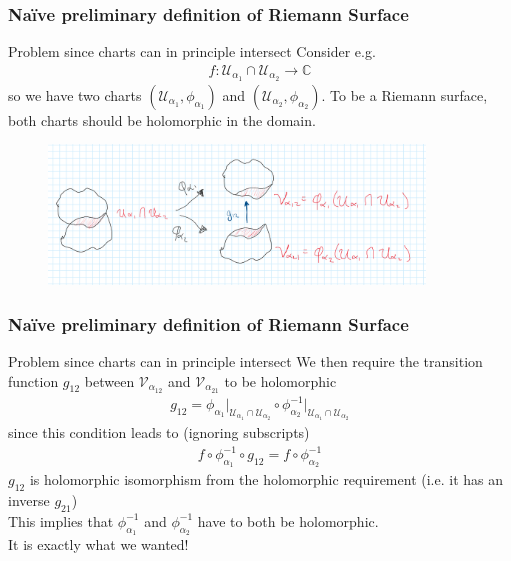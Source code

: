 \documentclass{beamer}[10]
\begin{document}
\begin{frame}
	\frametitle{Naïve preliminary definition of Riemann Surface}
	\begin{block}{Problem since charts can in principle intersect}
		Consider e.g. 
		\begin{equation}
			\begin{aligned}
				f:\mathcal{U}_{\alpha_1}\cap \mathcal{U}_{\alpha_2}\to \mathds{C}
			\end{aligned}
		\end{equation}
	so we have two charts $(\mathcal{U}_{\alpha_1},\phi_{\alpha_1})$ and $(\mathcal{U}_{\alpha_2},\phi_{\alpha_2})$. To be a Riemann surface, both charts should be holomorphic in the domain.
	\end{block}
\begin{figure}
	\includegraphics[width=10cm]{5}
\end{figure}
\end{frame} 


\begin{frame}
	\frametitle{Naïve preliminary definition of Riemann Surface}
	\begin{block}{Problem since charts can in principle intersect}
	We then require the transition function $g_{12}$ between $\mathcal{V}_{\alpha_{12}}$ and $\mathcal{V}_{\alpha_{21}}$ to be holomorphic
	\begin{equation}
		\begin{aligned}
			g_{12}=\phi_{\alpha_1}\big|_{\mathcal{U}_{\alpha_1}\cap \mathcal{U}_{\alpha_2}}\circ \phi_{\alpha_2}^{-1}\big|_{\mathcal{U}_{\alpha_1}\cap \mathcal{U}_{\alpha_2}}
		\end{aligned}
	\end{equation}
	since this condition leads to (ignoring subscripts)
	\begin{equation}
		\begin{aligned}
			f\circ \phi_{\alpha_1}^{-1}\circ g_{12}=f\circ \phi_{\alpha_2}^{-1}
		\end{aligned}
	\end{equation}
$g_{12}$ is holomorphic isomorphism from the holomorphic requirement (i.e. it has an inverse $g_{21}$)\\ This implies that
	$\phi^{-1}_{\alpha_1}$ and $\phi^{-1}_{\alpha_2}$ have to both be holomorphic. \\
	It is exactly what we wanted!
	\end{block}
\end{frame} 
\end{document}
